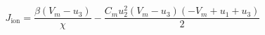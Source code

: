 $$
J_{\mathrm{ion}} = \frac{\beta \left(V_m - u_3\right)}{\chi} - \frac{C_m u_2^{2} \left(V_m - u_3\right) \left(- V_m + u_1 + u_3\right)}{2}
$$

